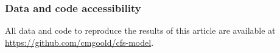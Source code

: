 \documentclass[12pt]{article}
\begin{document}
\subsubsection*{Data and code accessibility}
All data and code to reproduce the results of this article are available at \href{https://github.com/cmgoold/cfs-model}{https://github.com/cmgoold/cfs-model}.

\printbibliography
\end{document}
